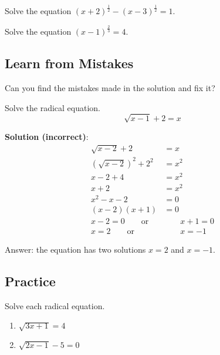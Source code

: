 \begin{example}

Solve the equation \((x+2)^{\frac12}-(x-3)^{\frac12}=1\).

\end{example}
\vspace*{5\baselineskip}

\begin{example}

Solve the equation \((x-1)^{\frac{2}{3}}=4\).

\end{example}
\vspace*{5\baselineskip}

\hypertarget{learn-from-mistakes}{%
\subsection{Learn from Mistakes}\label{learn-from-mistakes}}

\begin{example}

Can you find the mistakes made in the solution and fix it?

Solve the radical equation. \[\sqrt{x-1}+2=x\]

\textbf{Solution (incorrect)}: \[
\begin{aligned}
\sqrt{x-2}+2&=x\\
(\sqrt{x-2})^2+2^2&=x^2\\
x-2+4&=x^2\\
x+2&=x^2\\
x^2-x-2&=0\\
(x-2)(x+1)&=0\\
x-2=0 \qquad\text{or}& \qquad x+1=0\\
x=2 \qquad\text{or}&\qquad x=-1
\end{aligned}
\] 

Answer: the equation has two solutions \(x=2\) and \(x=-1\).

\end{example}
\vspace*{5\baselineskip}

\subsection{Practice}

\begin{exercise}

Solve each radical equation.

\begin{enumerate}
\item
  \(\sqrt{3x+1}=4\)
\item
  \(\sqrt{2x-1}-5=0\)
\end{enumerate}

\end{exercise}

